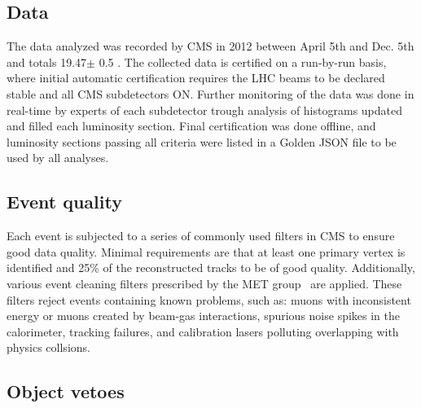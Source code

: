 \subsection{Data}
The data analyzed was recorded by CMS in 2012 between April 5th and Dec. 5th and
totals 19.47$\pm$ 0.5 \fbinv. The collected data is certified on a run-by-run 
basis, where initial automatic certification requires the LHC beams to be declared
stable and all CMS subdetectors ON. Further monitoring of the data was done in real-time
by experts of each subdetector trough analysis of histograms updated and filled
each luminosity section. Final certification was done offline, and luminosity sections passing
all criteria were listed in a Golden JSON file to be used by all analyses. 

\subsection{Event quality}

Each event is subjected to a series of commonly used filters in CMS to ensure good
data quality. Minimal requirements are that at least one primary vertex is identified 
and 25\% of the reconstructed tracks to be of good quality. Additionally, various event 
cleaning filters prescribed by the MET group~\cite{ref:MET-filters} are applied. These 
filters reject events containing known problems, such as: muons with inconsistent energy or 
muons created by beam-gas interactions, spurious noise spikes in the calorimeter, tracking
failures, and calibration lasers polluting overlapping with physics collsions. 





\subsection{Object vetoes\label{sec:vetoes}}

